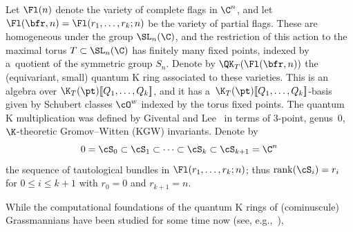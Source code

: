 
Let $\Fl(n)$ denote the variety of complete flags in $\C^n$, and let
$\Fl(\bfr,n)=\Fl(r_1, \dots, r_k; n)$ be the variety of partial flags. These are homogeneous under the group
$\SL_n(\C)$, and the restriction of this action to the maximal torus
$T \subset \SL_n(\C)$ has finitely many fixed points, indexed
by a~quotient of the symmetric group $S_n$.
Denote
by $\QK_T(\Fl(\bfr,n))$ the (equivariant, small) quantum K
ring associated to these varieties. This is an algebra over
$\K_T(\pt)[\![Q_1, \dots, Q_k]\!]$, and it has
a~$\K_T(\pt)[\![Q_1, \dots, Q_k]\!]$-basis given by Schubert classes
$\cO^w$ indexed by the torus fixed points. The quantum K multiplication
was defined by Givental and Lee~\cite{givental:onwdvv,lee:QK} in
terms of $3$-point, genus~$0$, $\K$-theoretic Gromov--Witten (KGW) invariants.
Denote by
\[ 0=\cS_0 \subset \cS_1 \subset \dots \subset \cS_k \subset \cS_{k+1}=\C^n \]
the sequence of tautological bundles in $\Fl(r_1, \dots, r_k; n)$; thus
$\mathrm{rank}(\cS_i)=r_i$ for $0\leq i\leq k+1$ with $r_0=0$ and $r_{k+1}=n$.

While the computational foundations of the quantum K rings
of (cominuscule) Grassmannians have been studied for some
time now (see, e.g.,~\cite{BCMP:qkpos,BCMP:qkchev,buch.m:qk,chaput.perrin:rationality,Gorbounov:2014,sinha2024quantum}),
